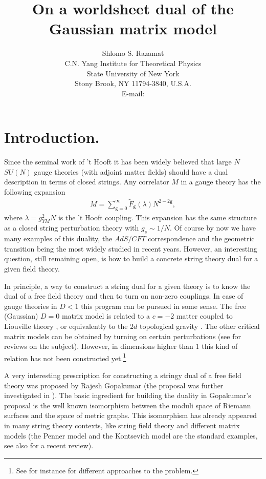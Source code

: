 \documentclass[11pt]{JHEP3}
\title{On a worldsheet dual of the Gaussian matrix model}
\author{Shlomo S. Razamat\\
C.N. Yang Institute for Theoretical Physics\\
State University of New York\\
Stony Brook, NY 11794-3840, U.S.A.\\
E-mail: \email{razamat@max2.physics.sunysb.edu}}
\def\be{\begin{eqnarray}}
\def\ee{\end{eqnarray}}
\def\gg{\mathsf g }
\begin{document}
\section{Introduction.}
Since the seminal work of 't Hooft \cite{'tHooft:1973jz} it has been widely believed that large $N$ $SU(N)$
gauge theories (with adjoint matter fields) should have a dual description in terms of closed strings.
Any correlator $M$ in a gauge theory has the following expansion
\be
M=\sum_{\gg=0}^\infty\tilde F_\gg(\lambda) N^{2-2\gg},
\ee where $\lambda=g_{YM}^2N$ is the 't Hooft coupling. This expansion has the same structure as a closed string
perturbation theory with $g_s \sim 1/N$. Of course by now we have many examples of this duality, the $AdS/CFT$ correspondence \cite{Maldacena:1997re} and the geometric transition \cite{Gopakumar:1998ki,Ooguri:2002gx} being the most widely studied in recent years. 
 However, an interesting question, still remaining open, is how to build a concrete string theory
dual for a given field theory.

In principle, a way to construct a string dual for a given theory is to know the dual of a free field theory and then to turn on
non-zero couplings. In case of gauge theories in $D<1$ this program can be pursued in some sense. The  free (Gaussian) $D=0$ matrix model is related
to a $c=-2$ matter coupled to Liouville theory \cite{Gross,Distler:1989ax}, or
equivalently to the $2d$ topological gravity \cite{Witten:1989ig,Witten:1990hr,Dijkgraaf:1990nc,Verlinde:1990ku}. The other critical matrix models can be obtained by turning on certain perturbations (see \cite{matrix_reviews,1d_review} for reviews on the subject). However, in dimensions higher than $1$ this kind of relation has not been constructed yet.\footnote{See for
instance \cite{FreeFields,StringBits,Karch,Bonelli:2004ve,Akhmedov} for different
approaches to the problem.}
 
  A very interesting prescription for constructing a stringy dual 
of a free field theory was proposed by Rajesh Gopakumar \cite{Gopakumar1,Gopakumar3} (the proposal was further investigated in \cite{Furuuchi:2005qm,Aharony:2006th,David:2006qc,Aharony:2007fs,Yaakov:2006ce}). The basic ingredient for building the duality
in Gopakumar's proposal is the well known isomorphism \cite{Strebel} between the moduli space of Riemann surfaces and the space of metric graphs. This 
isomorphism has already appeared in many string theory contexts,  like string field theory \cite{zwiebach} and different matrix models (the Penner  model \cite{Penner} and the Kontsevich
model \cite{Kontsevich:1992ti} are the standard examples, see also \cite{Mukhi:2003sz} for a recent review). 
\end{document}
